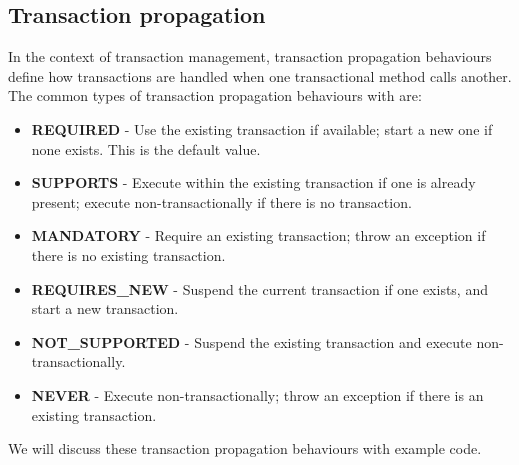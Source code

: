 \subsection{Transaction propagation}

In the context of transaction management, transaction propagation behaviours define how transactions are handled when one transactional method calls another. The common types of transaction propagation behaviours with are:
\begin{itemize}
\item \textbf{REQUIRED} - Use the existing transaction if available; start a new one if none exists. This is the default value.
\item \textbf{SUPPORTS} - Execute within the existing transaction if one is already present; execute non-transactionally if there is no transaction.
\item \textbf{MANDATORY} - Require an existing transaction; throw an exception if there is no existing transaction.
\item \textbf{REQUIRES\_NEW} - Suspend the current transaction if one exists, and start a new transaction.
\item \textbf{NOT\_SUPPORTED} - Suspend the existing transaction and execute non-transactionally.
\item \textbf{NEVER} - Execute non-transactionally; throw an exception if there is an existing transaction.
\end{itemize}

We will discuss these transaction propagation behaviours with example code.

